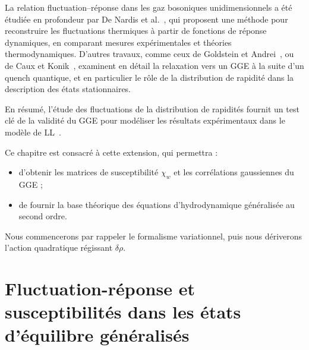 \medskip

La relation fluctuation–réponse dans les gaz bosoniques unidimensionnels a été étudiée en profondeur par De Nardis et al.~\cite{DeNardis2017}, qui proposent une méthode pour reconstruire les fluctuations thermiques à partir de fonctions de réponse dynamiques, en comparant mesures expérimentales et théories thermodynamiques. D'autres travaux, comme ceux de Goldstein et Andrei~\cite{Goldstein2013}, ou de Caux et Konik~\cite{CauxKonik2012}, examinent en détail la relaxation vers un GGE à la suite d’un quench quantique, et en particulier le rôle de la distribution de rapidité dans la description des états stationnaires.


\medskip
En résumé, l’étude des fluctuations de la distribution de rapidités fournit un test clé de la validité du \gls{GGE} pour modéliser les résultats expérimentaux dans le modèle de \gls{LL}~\cite{DeNardis2017}.

\medskip
Ce chapitre est consacré à cette extension, qui permettra :
\begin{itemize}[label = $\bullet$]
  \item d’obtenir les matrices de susceptibilité \(\chi_{w}\)  et les corrélations gaussiennes du \gls{GGE} ;
  \item de fournir la base théorique des équations d’hydrodynamique généralisée au second ordre.
\end{itemize}

Nous commencerons par rappeler le formalisme variationnel, puis nous dériverons l’action quadratique régissant \(\delta\rho\).  %

\medskip




\section{Fluctuation-réponse et susceptibilités dans les états d’équilibre généralisés}

